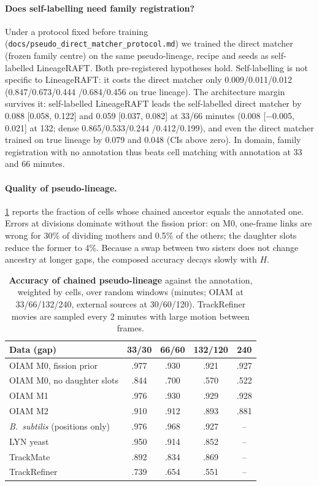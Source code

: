 \documentclass[10pt,twocolumn,letterpaper]{article}
\newcommand{\ours}{LineageRAFT\xspace}
\begin{document}
\paragraph{Does self-labelling need family registration?}
Under a protocol fixed before training (\texttt{docs/pseudo\_direct\_matcher\_protocol.md}) we trained the direct matcher (frozen family centre) on the same pseudo-lineage, recipe and seeds as self-labelled \ours. Both pre-registered hypotheses hold. Self-labelling is not specific to \ours: it costs the direct matcher only 0.009/0.011/0.012 (0.847/0.673/0.444 /0.684/0.456 on true lineage). The architecture margin survives it: self-labelled \ours leads the self-labelled direct matcher by 0.088 [0.058, 0.122] and 0.059 [0.037, 0.082] at 33/66 minutes (0.008 [$-$0.005, 0.021] at 132; dense 0.865/0.533/0.244 /0.412/0.199), and even the direct matcher trained on true lineage by 0.079 and 0.048 (CIs above zero). In domain, family registration with no annotation thus beats cell matching with annotation at 33 and 66 minutes.

\paragraph{Quality of pseudo-lineage.}
\cref{tab:pseudo} reports the fraction of cells whose chained ancestor equals the annotated one.
Errors at divisions dominate without the fission prior: on M0, one-frame links are wrong for 30\% of dividing mothers and 0.5\% of the others; the daughter slots reduce the former to 4\%.
Because a swap between two sisters does not change ancestry at longer gaps, the composed accuracy decays slowly with $H$.

\begin{table}[t]
\centering\small
\setlength{\tabcolsep}{4pt}
\begin{tabular}{lcccc}
\toprule
Data (gap) & 33/30 & 66/60 & 132/120 & 240 \\
\midrule
OIAM M0, fission prior & .977 & .930 & .921 & .927 \\
OIAM M0, no daughter slots & .844 & .700 & .570 & .522 \\
OIAM M1 & .976 & .930 & .929 & .928 \\
OIAM M2 & .910 & .912 & .893 & .881 \\
\midrule
\emph{B.\ subtilis} (positions only) & .976 & .968 & .927 & -- \\
LYN yeast & .950 & .914 & .852 & -- \\
TrackMate & .892 & .834 & .869 & -- \\
TrackRefiner & .739 & .654 & .551 & -- \\
\bottomrule
\end{tabular}
\caption{\textbf{Accuracy of chained pseudo-lineage} against the annotation, weighted by cells, over random windows (minutes; OIAM at 33/66/132/240, external sources at 30/60/120). TrackRefiner movies are sampled every 2 minutes with large motion between frames.}
\label{tab:pseudo}
\end{table}
\end{document}
